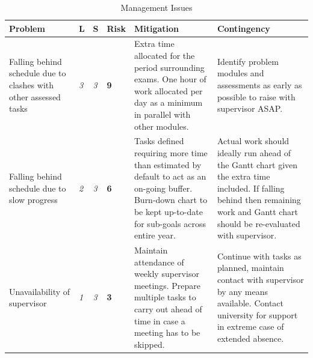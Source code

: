 \documentclass[12pt,a4,xcolor=table]{article}
\begin{document}
	\begin{table}[h!]
		\centering
		\caption{Management Issues}
		\label{table:risk1}
		\footnotesize
		\begin{tabular}{|>{\centering}m{1.5in} |>{\centering}m{0.1in} |>{\centering}m{0.1in} |>{\centering}m{0.3in} |>{\centering}m{1.8in} |>{\centering\arraybackslash}m{1.8in}|}
			\hline
			\textbf{Problem}                                                 & \textbf{L}                & \textbf{S}                  & \textbf{Risk}                      & \textbf{Mitigation}                                                                                                                                               & \textbf{Contingency}                                                                                                                                                                 \\ \hline
			Falling behind schedule due to clashes with other assessed tasks & \cellcolor[HTML]{FFC702}\textit{3} & \cellcolor[HTML]{FFC702}\textit{3} & \cellcolor[HTML]{FFC702}\textbf{9} & Extra time allocated for the period surrounding exams. One hour of work allocated per day as a minimum in parallel with other modules.                            & Identify problem modules and assessments as early as possible to raise with supervisor ASAP.                                                                                         \\ \hline
			Falling behind schedule due to slow progress                     & \cellcolor[HTML]{F8FF00}\textit{2} & \cellcolor[HTML]{FFC702}\textit{3} & \cellcolor[HTML]{FFC702}\textbf{6} & Tasks defined requiring more time than estimated by default to act as an on-going buffer. Burn-down chart to be kept up-to-date for sub-goals across entire year. & Actual work should ideally run ahead of the Gantt chart given the extra time included. If falling behind then remaining work and Gantt chart should be re-evaluated with supervisor. \\ \hline
			Unavailability of supervisor                                     & \cellcolor[HTML]{ABCB00}\textit{1} & \cellcolor[HTML]{FFC702}\textit{3} & \cellcolor[HTML]{F8FF00}\textbf{3} & Maintain attendance of weekly supervisor meetings. Prepare multiple tasks to carry out ahead of time in case a meeting has to be skipped.                         & Continue with tasks as planned, maintain contact with supervisor by any means available. Contact university for support in extreme case of extended absence.                         \\ \hline

\end{tabular}
\end{table}
\end{document}
